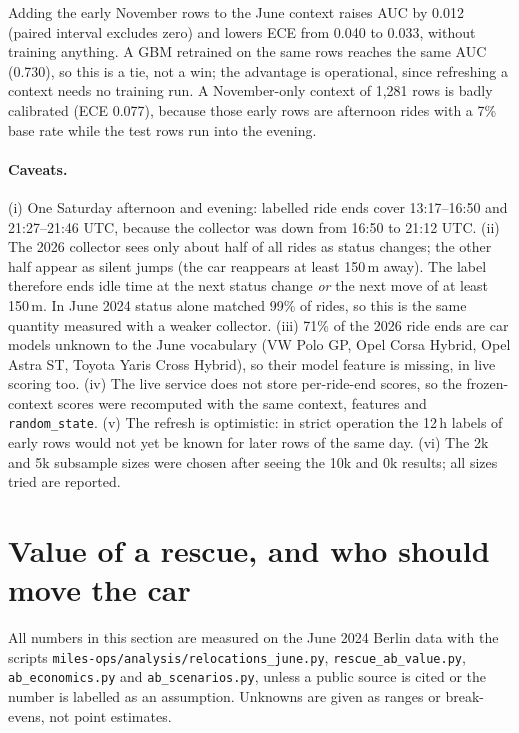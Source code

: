 \documentclass[11pt,a4paper]{article}
\begin{document}
Adding the early November rows to the June context raises AUC by 0.012 (paired interval excludes zero) and lowers ECE from 0.040 to 0.033, without training anything. A GBM retrained on the same rows reaches the same AUC (0.730), so this is a tie, not a win; the advantage is operational, since refreshing a context needs no training run. A November-only context of 1{,}281 rows is badly calibrated (ECE 0.077), because those early rows are afternoon rides with a 7\% base rate while the test rows run into the evening.

\paragraph{Caveats.} (i) One Saturday afternoon and evening: labelled ride ends cover 13:17--16:50 and 21:27--21:46 UTC, because the collector was down from 16:50 to 21:12 UTC. (ii) The 2026 collector sees only about half of all rides as status changes; the other half appear as silent jumps (the car reappears at least 150\,m away). The label therefore ends idle time at the next status change \emph{or} the next move of at least 150\,m. In June 2024 status alone matched 99\% of rides, so this is the same quantity measured with a weaker collector. (iii) 71\% of the 2026 ride ends are car models unknown to the June vocabulary (VW Polo GP, Opel Corsa Hybrid, Opel Astra ST, Toyota Yaris Cross Hybrid), so their model feature is missing, in live scoring too. (iv) The live service does not store per-ride-end scores, so the frozen-context scores were recomputed with the same context, features and \texttt{random\_state}. (v) The refresh is optimistic: in strict operation the 12\,h labels of early rows would not yet be known for later rows of the same day. (vi) The 2k and 5k subsample sizes were chosen after seeing the 10k and 0k results; all sizes tried are reported.

\section{Value of a rescue, and who should move the car}\label{sec:value}

All numbers in this section are measured on the June 2024 Berlin data with the scripts \texttt{miles-ops/analysis/relocations\_june.py}, \texttt{rescue\_ab\_value.py}, \texttt{ab\_economics.py} and \texttt{ab\_scenarios.py}, unless a public source is cited or the number is labelled as an assumption. Unknowns are given as ranges or break-evens, not point estimates.
\end{document}
